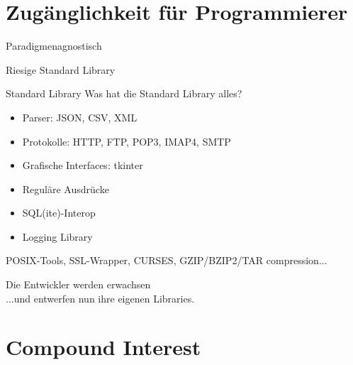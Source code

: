 \documentclass{beamer}
\begin{document}
\section{Zug\"anglichkeit f\"ur Programmierer}

\begin{frame}
\begin{center}
\Huge Paradigmenagnostisch
\end{center}
\end{frame}

\begin{frame}
\begin{center}
\Huge Riesige Standard Library
\end{center}
\end{frame}

\begin{frame}{Standard Library}
Was hat die Standard Library alles?
\begin{itemize}
\item Parser: JSON, CSV, XML
\item Protokolle: HTTP, FTP, POP3, IMAP4, SMTP
\item Grafische Interfaces: tkinter
\item Regul\"are Ausdr\"ucke
\item SQL(ite)-Interop
\item Logging Library
\end{itemize}
POSIX-Tools, SSL-Wrapper, CURSES, GZIP/BZIP2/TAR compression...
\end{frame}

\begin{frame}
\begin{center}
{ \Huge Die Entwickler werden erwachsen}\\
...und entwerfen nun ihre eigenen Libraries.
\end{center}
\end{frame}

\section{Compound Interest}
\end{document}
